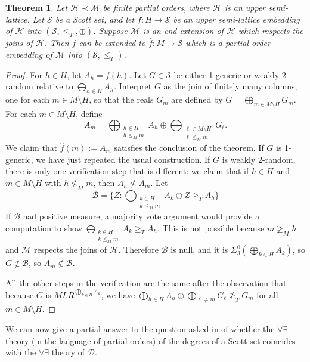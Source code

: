 \documentclass{amsart}
\newtheorem{thm}{Theorem}
\newcommand{\cS}{\mathcal S}
\newcommand{\cH}{\mathcal H}
\newcommand{\cM}{\mathcal M}
\begin{document}
\begin{thm}\label{thm5}
Let $\cH \prec \cM$ be finite partial orders, where 
$\cH$ is an upper semi-lattice.  
Let $\cS$ be a Scott set, and let
$f:H\rightarrow \cS$ be an upper semi-lattice embedding of 
$\cH$ into $(\cS, \leq_T, \oplus)$.
Suppose $\cM$ is an end-extension of $\cH$ 
which respects the joins of $\cH$.  Then $f$ can be extended to  
$\hat f:M\rightarrow \cS$ which is a partial order embedding
of $\cM$ into $(\cS, \leq_T)$.
\end{thm}
\begin{proof}  For $h \in H$, let $A_h = f(h)$.
Let $G \in \mathcal S$ be either 1-generic or weakly 2-random relative to 
$\bigoplus_{h \in H} A_h$.  Interpret $G$ as the join of finitely many 
columns, one for each $m \in M \setminus H$, so that the reals $G_m$ 
are defined by $G = \bigoplus_{m \in M\setminus H} G_m$. 
For each $m \in M \setminus H$, define 
$$A_m = \bigoplus_{\substack{h \in H \\ h \leq_M m}} A_h 
\oplus \bigoplus_{\substack{\ell \in M\setminus H \\ \ell \leq_M m}} G_\ell.$$
We claim that $\hat f(m) := A_m$ satisfies 
the conclusion of the theorem.  If $G$ is 1-generic, 
we have just repeated the usual construction.  If $G$ is 
weakly 2-random, there is only one verification step that is different:
we claim that if $h \in H$ and $m \in M\setminus H$ with $h \not\leq_M m$, 
then $A_h \not\leq A_m$.  Let 
$$\mathcal B = \{Z : \bigoplus_{\substack{k \in H\\ k \leq_M m}}A_k \oplus Z \geq_T A_h\}$$
If $\mathcal B$ had positive measure, 
a majority vote argument would provide a computation to show
$\bigoplus_{\substack{k \in H\\ k \leq_M m}}A_k \geq_T A_h$.  This is not 
possible because $m\not\geq_M h$ and $\cM$ respects the joins of $\cH$.  
Therefore $\mathcal B$ is null, and it 
is $\Sigma^0_3(\bigoplus_{k \in H} A_k)$, so 
$G \not\in \mathcal B$, so $A_m \not\in \mathcal B$.

All the other steps in the verification are the same after the observation 
that because $G$ is $MLR^{\bigoplus_{k\in H} A_k}$, we have
$\bigoplus_{h\in H} A_h \oplus \bigoplus_{\ell \neq m} G_\ell \not\geq_T G_m$ 
for all $m \in M \setminus H$.
\end{proof}

We can now give a partial answer to the question asked in \cite{kuceraslaman} 
of whether the $\forall\exists$ theory (in the language of partial orders)
of the degrees of a Scott set 
coincides with the $\forall\exists$ theory of $\mathcal D$. 
\end{document}
